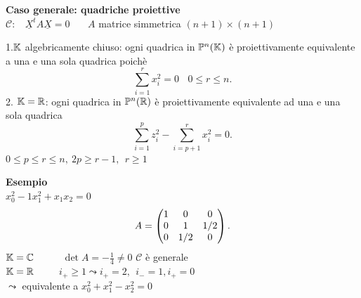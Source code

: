 \documentclass[12px]{article}
\begin{document}
	\textbf{Caso generale: quadriche proiettive}\\
	$\mathscr{C}: \ \ \ \ \underline X^t A \underline X =0 $ \ \ \  $A$ matrice simmetrica $(n+1)\times(n+1)$\\
	\newpage
	 \begin{teo}
		1.$\mathbb{K}$ algebricamente chiuso: ogni quadrica in $\mathbb{P}^n(\mathbb{K})$ è proiettivamente equivalente a una e una sola quadrica poichè
		\[
		 \sum^r_{i=1}x_i^2=0 \ \ \ \ 0\leq r\leq n
		.\] 
		2. $\mathbb{K}=\mathbb{R}$: ogni quadrica in $\mathbb{P}^n(\mathbb{R})$ è proiettivamente equivalente ad una e una sola quadrica
		\[
		\sum^p_{i=1}z_i^2 - \sum^r_{i=p+1}x_i^2=0
		.\] 
		$0\leq p \leq r\leq n, \ 2p\geq r-1, \ \ r\geq 1$
	\end{teo}
	\textbf{Esempio}\\
	$x_0^2 -1 x_1^2 + x_1x_2=0$\\
	 \[
		 A=\begin{pmatrix}1&0&0\\0&1&1/2\\0&1/2&0\end{pmatrix}
	.\] 
	$\mathbb{K}=\mathbb{C}$ \ \ \ \ \ $\det A = -\frac 1 4\neq 0$ $\mathscr{C}$ è generale\\
	$\mathbb{K} = \mathbb{R}$\ \ \ \ \  $i_+\geq 1 \leadsto i_+=2,\ \ i_-=1,i_+=0$\\
	 $\leadsto $ equivalente a $x_0^2+x_1^2-x_2^2=0$
\end{document}
